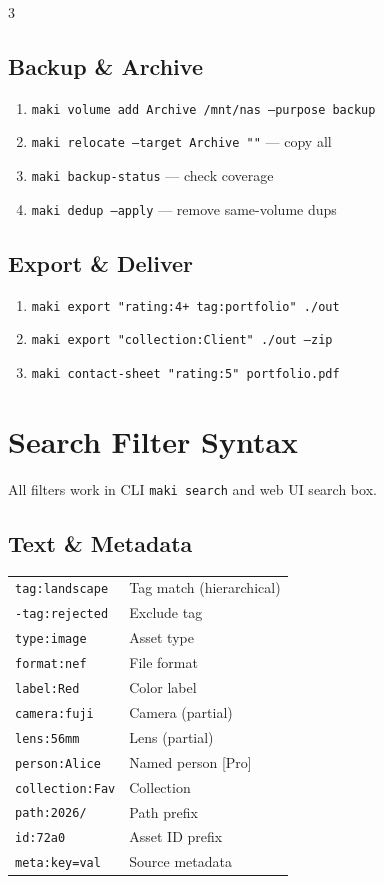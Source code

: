 \documentclass[a4paper,landscape,8pt]{article}
\newcommand{\cmd}[1]{\texttt{\footnotesize #1}}
\newcommand{\pro}{\textcolor{maki-teal}{\scriptsize [Pro]}}
\begin{document}
\begin{multicols}{3}
\subsection{Backup \& Archive}
\begin{enumerate}[leftmargin=1.5em]
\item \cmd{maki volume add Archive /mnt/nas --purpose backup}
\item \cmd{maki relocate --target Archive ""} — copy all
\item \cmd{maki backup-status} — check coverage
\item \cmd{maki dedup --apply} — remove same-volume dups
\end{enumerate}

\subsection{Export \& Deliver}
\begin{enumerate}[leftmargin=1.5em]
\item \cmd{maki export "rating:4+ tag:portfolio" ./out}
\item \cmd{maki export "collection:Client" ./out --zip}
\item \cmd{maki contact-sheet "rating:5" portfolio.pdf}
\end{enumerate}

\columnbreak

\section{Search Filter Syntax}

All filters work in CLI \cmd{maki search} and web UI search box.

\subsection{Text \& Metadata}
\begin{tabularx}{\columnwidth}{@{}lX@{}}
\cmd{tag:landscape} & Tag match (hierarchical) \\
\cmd{-tag:rejected} & Exclude tag \\
\cmd{type:image} & Asset type \\
\cmd{format:nef} & File format \\
\cmd{label:Red} & Color label \\
\cmd{camera:fuji} & Camera (partial) \\
\cmd{lens:56mm} & Lens (partial) \\
\cmd{person:Alice} & Named person \pro \\
\cmd{collection:Fav} & Collection \\
\cmd{path:2026/} & Path prefix \\
\cmd{id:72a0} & Asset ID prefix \\
\cmd{meta:key=val} & Source metadata \\
\end{tabularx}


\end{multicols}
\end{document}
